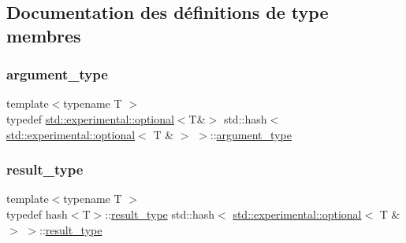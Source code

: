 \subsection{Documentation des définitions de type membres}
\mbox{\label{structstd_1_1hash_3_01std_1_1experimental_1_1optional_3_01_t_01_6_01_4_01_4_ab5e4cdb491b0c3833fa266cdf95a26f8}} 
\subsubsection{\texorpdfstring{argument\+\_\+type}{argument\_type}}
{\footnotesize\ttfamily template$<$typename T $>$ \\
typedef \hyperlink{classstd_1_1experimental_1_1optional}{std\+::experimental\+::optional}$<$T\&$>$ std\+::hash$<$ \hyperlink{classstd_1_1experimental_1_1optional}{std\+::experimental\+::optional}$<$ T \& $>$ $>$\+::\hyperlink{structstd_1_1hash_3_01std_1_1experimental_1_1optional_3_01_t_01_6_01_4_01_4_ab5e4cdb491b0c3833fa266cdf95a26f8}{argument\+\_\+type}}

\mbox{\label{structstd_1_1hash_3_01std_1_1experimental_1_1optional_3_01_t_01_6_01_4_01_4_acfb996ccc0604598b856ff0b73abf1a0}} 
\subsubsection{\texorpdfstring{result\+\_\+type}{result\_type}}
{\footnotesize\ttfamily template$<$typename T $>$ \\
typedef hash$<$T$>$\+::\hyperlink{structstd_1_1hash_3_01std_1_1experimental_1_1optional_3_01_t_01_6_01_4_01_4_acfb996ccc0604598b856ff0b73abf1a0}{result\+\_\+type} std\+::hash$<$ \hyperlink{classstd_1_1experimental_1_1optional}{std\+::experimental\+::optional}$<$ T \& $>$ $>$\+::\hyperlink{structstd_1_1hash_3_01std_1_1experimental_1_1optional_3_01_t_01_6_01_4_01_4_acfb996ccc0604598b856ff0b73abf1a0}{result\+\_\+type}}



